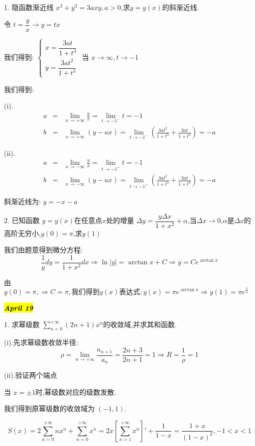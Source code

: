 1. 隐函数渐近线 $x^3+y^3=3axy,a>0$,求$y=y(x)$的斜渐近线.
\begin{solution}
	
	令 $t=\dfrac{y}{x}\rightarrow y=tx$
	
	我们得到: $\left\lbrace 
	\begin{array}{l}
		x=\dfrac{3at}{1+t^3}\\
		y=\dfrac{3at^2}{1+t^3}
	\end{array}
	\right. $
	当 $x\rightarrow \infty,t\rightarrow -1$
	
	我们得到: 
	
	(i).
	\begin{eqnarray*}
		a&=&\lim\limits_{x\rightarrow +\infty}\frac{y}{x}=\lim\limits_{t\rightarrow -1^{-} }t=-1\\
		b&=&\lim\limits_{x\rightarrow +\infty}(y-ax)=\lim\limits_{t\rightarrow -1^{-}}(\frac{3at^2}{1+t^3}+\frac{3at}{1+t^3})=-a
	\end{eqnarray*}
	
	(ii).
	\begin{eqnarray*}
		a&=&\lim\limits_{x\rightarrow -\infty}\frac{y}{x}=\lim\limits_{t\rightarrow -1^{+} }t=-1\\
		b&=&\lim\limits_{x\rightarrow -\infty}(y-ax)=\lim\limits_{t\rightarrow -1^{+}}(\frac{3at^2}{1+t^3}+\frac{3at}{1+t^3})=-a
	\end{eqnarray*}
	
	斜渐近线为: $y=-x-a$
\end{solution}

2. 已知函数 $y=y(x)$在任意点$x$处的增量 $\Delta y=\dfrac{y\Delta x}{1+x^2}+\alpha$,当$\Delta x\rightarrow 0$,$\alpha$是$\Delta x$的高阶无穷小,$y(0)=\pi$,求$y(1)$
\begin{solution}
	
	我们由题意得到微分方程: 
	$$\frac{1}{y}dy=\frac{1}{1+x^2}dx\Rightarrow \ln|y|=\arctan x+C\Rightarrow y=Ce^{\arctan x}$$
	
	由 $y(0)=\pi,\Rightarrow C=\pi,\text{我们得到}y(x)\text{表达式}: y(x)=\pi e^{\arctan x}\Rightarrow y(1)=\pi e^{\frac{\pi}{4}}$
\end{solution}

\hl{\textbf{\textit{April 19}}}

1. 求幂级数 $\sum\limits_{n=0}^{+\infty}(2n+1)x^n$的收敛域,并求其和函数.
\begin{solution}
	
	(i).先求幂级数收敛半径: 
	$$\rho=\lim\limits_{n\rightarrow +\infty}\frac{a_{n+1}}{a_{n}}=\frac{2n+3}{2n+1}=1\Rightarrow R=\frac{1}{\rho}=1$$
	
	(ii).验证两个端点
	
	当 $x=\pm1$时,幂级数对应的级数发散.
	
	我们得到原幂级数的收敛域为 $(-1,1)$.
	
	$$S(x)=2\sum\limits_{n=0}^{+\infty}nx^n+\sum\limits_{n=0}^{+\infty}x^n=2x[\sum\limits_{n=1}^{+\infty}x^n]'+\frac{1}{1-x}=\frac{1+x}{(1-x)^2},-1<x<1$$
\end{solution}

